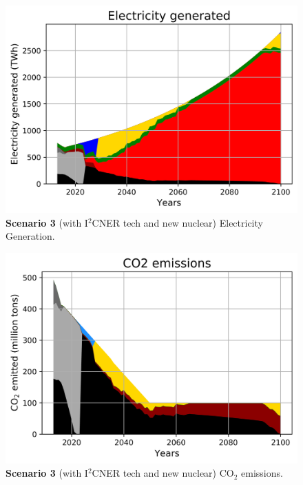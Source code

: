 \documentclass[final]{beamer}
\newlength{\onecolwid}
\newlength{\twocolwid}
\newlength{\threecolwid}
\begin{document}
\begin{frame}[t]
\begin{columns}[t,totalwidth=\threecolwid]
\begin{column}{\twocolwid}
\begin{columns}[t,totalwidth=\twocolwid]
\begin{column}{\onecolwid}

\begin{figure}[H] 
\centering
\includegraphics[scale=1.62]{i2cner_nuc_elc}
\caption{\textbf{Scenario 3} (with I$^2$CNER tech and new nuclear) Electricity Generation.}
\label{s3e}
\end{figure}

\begin{figure}[H] 
\centering
\includegraphics[scale=1.62]{i2cner_nuc_co2}
\caption{\textbf{Scenario 3} (with I$^2$CNER tech and new nuclear) CO$_2$ emissions.}
\label{s3c}
\end{figure}



\end{column}
\end{columns}
\end{column}
\end{columns}
\end{frame}
\end{document}
